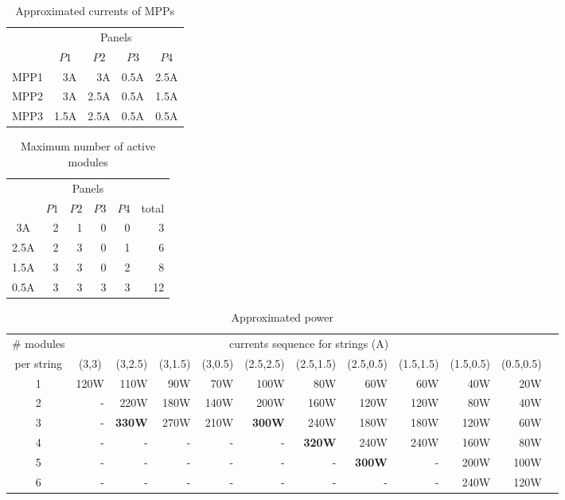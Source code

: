 \documentclass[conference]{IEEEtran}
\begin{document}
\begin{table}[t]
\caption{Approximated currents of MPPs}
\label{tab:approximated}
\centering
\begin{tabular}{c|rrrr}	
\hline\hline
       &    	\multicolumn{4}{c}{Panels}	\\
	&	\multicolumn{1}{c}{$P1$}	&	\multicolumn{1}{c}{$P2$}	&	\multicolumn{1}{c}{$P3$}	&	\multicolumn{1}{c}{$P4$}	\\ \hline
MPP1	&	3A	&	3A	&	0.5A	&	2.5A	\\ \hline
MPP2	&	3A	&	2.5A	&	0.5A	&	1.5A	\\ \hline
MPP3	&	1.5A	&	2.5A	&	0.5A	&	0.5A	\\ \hline
\end{tabular}
\end{table}

\begin{table}[t]
\caption{Maximum number of active modules}
\label{tab:modules}
\centering
\begin{tabular}{c|rrrr|r}	
\hline\hline
       &    	\multicolumn{4}{c|}{Panels}	& \\									
	&	\multicolumn{1}{c}{$P1$}	&	\multicolumn{1}{c}{$P2$}	&	\multicolumn{1}{c}{$P3$}	&	\multicolumn{1}{c}{$P4$} &	\multicolumn{1}{|c}{total}	\\ \hline
3A	&	2	&	1	&	0	&	0 & 3	\\ \hline
2.5A	&	2	&	3	&	0	&	1 & 6	\\ \hline
1.5A	&	3	&	3	&	0	&	2 & 8	\\ \hline
0.5A	&	3	&	3	&	3	&	3 & 12	\\ \hline
\end{tabular}
\end{table}

\begin{table}[t]
\caption{Approximated power}
\label{tab:powers}
\centering
\begin{tabular}{c|rrrrrrrrrrr}
\hline\hline	
\# modules & 	\multicolumn{10}{c}{currents sequence for strings (A)} \\ 																
per string		&	\multicolumn{1}{c}{(3,3)}	&	\multicolumn{1}{c}{(3,2.5)}	&	\multicolumn{1}{c}{(3,1.5)}	&	\multicolumn{1}{c}{(3,0.5)}	&	\multicolumn{1}{c}{(2.5,2.5)}	&	\multicolumn{1}{c}{(2.5,1.5)}	&	\multicolumn{1}{c}{(2.5,0.5)}	&	\multicolumn{1}{c}{(1.5,1.5)}	&	\multicolumn{1}{c}{(1.5,0.5)}	&	\multicolumn{1}{c}{(0.5,0.5)}	\\ \hline
	1	&	120W	&	110W	&	90W	&	70W	&	100W	&	80W	&	60W	&	60W	&	40W	&	20W	\\ \hline
	2	&	-	&	220W	&	180W	&	140W	&	200W	&	160W	&	120W	&	120W	&	80W	&	40W	\\ \hline	3	&	-	&\textbf{330W}&	270W	&	210W	&	\textbf{300W}	&	240W	&	180W	&	180W	&	120W	&	60W	\\ \hline
4	&	-	&	-	&	-	&	-	&	-	&	\textbf{320W}	&	240W	&	240W	&	160W	&	80W	\\ \hline
	 5	&	-	&	-	&	-	&	-	&	-	&	-	&	\textbf{300W}	&	-	&	200W	&	100W	\\ \hline
	6	&	-	&	-	&	-	&	-	&	-	&	-	&	-	&	-	&	240W	&	120W	\\ \hline
\end{tabular}
\end{table}
\end{document}
